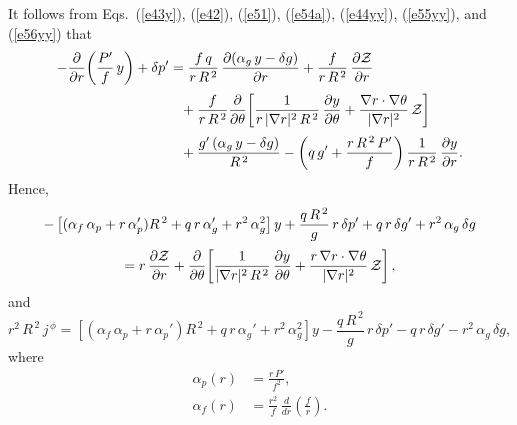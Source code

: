\documentclass[12pt,prb,aps]{revtex4-1}
\begin{document}
It follows from Eqs.~(\ref{e43y}), (\ref{e42}), (\ref{e51}), (\ref{e54a}), (\ref{e44yy}),  (\ref{e55yy}), and (\ref{e56yy}) that
\begin{align}
-\frac{\partial}{\partial r}\!\left(\frac{P'}{f}\,y\right)+\delta p'&= \frac{f\,q}{r\,R^{\,2}}\,\frac{\partial (\alpha_g\,y-\delta g)}{\partial r} 
+ \frac{f}{r\,R^{\,2}}\,\frac{\partial {\cal Z}}{\partial r}\nonumber\\[0.5ex]
&\phantom{=} +\frac{f}{r\,R^{\,2}}\frac{\partial}{\partial\theta}\!\left[\frac{1}{r\,|\nabla r|^2\,R^{\,2}}\,\frac{\partial y}{\partial \theta} + \frac{\nabla r\cdot\nabla\theta}{|\nabla r|^2}\,{\cal Z}\right]
\nonumber\\[0.5ex]
&\phantom{=} + \frac{g'\,(\alpha_g\,y-\delta g)}{R^{\,2}} - \left(q\,g'+\frac{r\,R^{\,2}\,P'}{f}\right)\frac{1}{r\,R^{\,2}}\,\frac{\partial y}{\partial r}.
\end{align}
Hence,
\begin{multline}\label{e58u}
-\left[(\alpha_f\,\alpha_p+ r\,\alpha_p')R^{\,2} + q\,r\,\alpha_g'+r^2\,\alpha_g^2\right]y + \frac{q\,R^{\,2}}{g}\,r\,\delta p' + q\,r\,\delta g' + r^2\,\alpha_g\,\delta g\\[0.5ex]
= r\,\frac{\partial {\cal Z}}{\partial r}+\frac{\partial}{\partial\theta}\!\left[\frac{1}{|\nabla r|^2\,R^{\,2}}\,\frac{\partial y}{\partial \theta} + \frac{r\,\nabla r\cdot\nabla\theta}{|\nabla r|^2}\,{\cal Z}\right],
\end{multline}
and
\begin{equation}\label{jphi}
r^2\,R^{\,2}\,j^{\,\phi} = \left[(\alpha_f\,\alpha_p+ r\,\alpha_p')R^{\,2} + q\,r\,\alpha_g'+r^2\,\alpha_g^2\right]y - \frac{q\,R^{\,2}}{g}\,r\,\delta p' - q\,r\,\delta g' - r^2\,\alpha_g\,\delta g,
\end{equation}
where 
\begin{align}\label{alpp}
\alpha_p(r)&= \frac{r\,P'}{f^2},\\[0.5ex]
\alpha_f(r) &= \frac{r^2}{f}\,\frac{d}{dr}\!\left(\frac{f}{r}\right).\label{alpf}
\end{align}
\end{document}
